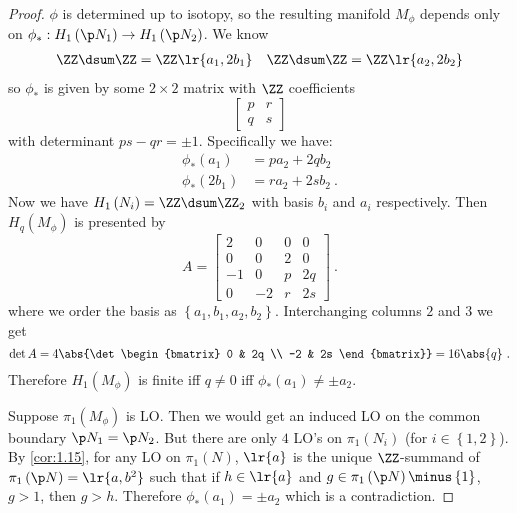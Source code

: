 \begin{proof}
$\phi$ is determined up to isotopy, so the resulting manifold $M_\phi$ depends only on
$\phi_* : H_1\left(\p N_1\right)\to H_1\left(\p N_2\right)$.
We know
\begin{align}
\ZZ\dsum \ZZ = \ZZ\lr{a_1 , 2b_1}
&&
\ZZ\dsum \ZZ = \ZZ\lr{a_2 , 2b_2}
\end{align}
so $\phi_*$ is given by some $2\times 2$ matrix
with $\ZZ$ coefficients
\begin{equation}
\begin{bmatrix}
p & r \\ q & s
\end{bmatrix}
\end{equation}
with determinant $ps - qr = \pm 1$. 
Specifically we have:
\begin{align}
\phi_*\left(a_1\right) &= pa_2 + 2qb_2 \\
\phi_*\left(2b_1\right) &= ra_2 + 2s b_2\ .
\end{align}
Now we have
$H_1\left(N_i\right) = \ZZ\dsum \ZZ_2$ with basis $b_i$ and $a_i$ respectively. 
Then $H_q\left(M_\phi\right)$ is presented by
\begin{equation}
A = \begin{bmatrix}
2 & 0 & 0 & 0 \\
0 & 0 & 2 & 0 \\
-1 & 0 & p & 2q \\
0 & -2 & r & 2s
\end{bmatrix}
\ .
\end{equation}
where we order the basis as $\left\{a_1 , b_1 , a_2 , b_2\right\}$.
Interchanging columns $2$ and $3$ we get
\begin{equation}
\det A = 4\abs{\det 
\begin{bmatrix}
0 & 2q \\ -2 & 2s
\end{bmatrix}} = 
16 \abs{q}
\ .
\end{equation}
Therefore $H_1\left(M_\phi\right)$ is finite iff $q\neq 0$ iff $\phi_*\left(a_1\right)\neq
\pm a_2$.

Suppose $\pi_1\left(M_\phi\right)$ is LO. Then we would get an induced LO on the common
boundary $\p N_1 = \p N_2$.
But there are only $4$ LO's on $\pi_1\left(N_i\right)$ (for $i \in \left\{1,2\right\}$).
By \cref{cor:1.15}, for any LO on $\pi_1\left(N\right)$, $\lr{a}$ is the unique
$\ZZ$-summand of 
$\pi_1\left(\p N\right) = \lr{a , b^2}$ such that if $h\in \lr{a}$ and $g\in \pi_1\left(\p
N\right)\minus \left\{1\right\}$, $g > 1$, then $g > h$.
Therefore $\phi_*\left(a_1\right) = \pm a_2$ which is a contradiction.
\end{proof}

